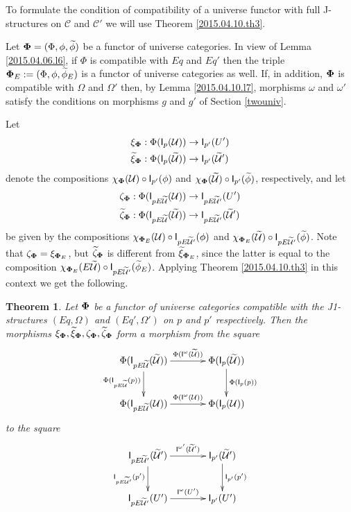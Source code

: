 \documentclass[12pt]{article}
\numberwithin{equation}{section}
\newtheorem{theorem}[proposition]{Theorem}
\newcommand{\sr}{\rightarrow}
\newcommand{\wt}{\widetilde}
\newcommand{\C}{{\mathcal C}}  %
\newcommand{\U}{\mathcal{U}}
\newcommand{\I}{\mathsf{I}}
\begin{document}
To formulate the condition of compatibility of a universe functor with full
J-structures on $\C$ and $\C'$ we will use Theorem
\ref{2015.04.10.th3}.

Let ${\bf\Phi}=(\Phi,\phi,\wt{\phi})$ be a functor of universe categories. In
view of Lemma \ref{2015.04.06.l6}, if $\Phi$ is compatible with $Eq$ and $Eq'$
then the triple ${\bf\Phi}_{E}:=(\Phi,\phi,\wt{\phi}_{E})$ is a functor of
universe categories as well. If, in addition, ${\bf\Phi}$ is compatible with
$\Omega$ and $\Omega'$ then, by Lemma \ref{2015.04.10.l7}, morphisms $\omega$
and $\omega'$ satisfy the conditions on morphisms $g$ and $g'$ of Section
\ref{twouniv}.

Let
%
\begin{align*}
  \xi_{\bf\Phi}&:\Phi(\I_p(\U))\sr \I_{p'}(U') \\
  \wt{\xi}_{\bf\Phi}&:\Phi(\I_p(\wt{\U}))\sr \I_{p'}(\wt{\U}')
\end{align*}
%
denote the compositions $\chi_{\bf\Phi}(\U)\circ \I_{p'}(\phi)$ and
$\chi_{\bf\Phi}(\wt{\U})\circ \I_{p'}(\wt{\phi})$, respectively, and let
%
\begin{align*}
  \zeta_{\bf\Phi}&:\Phi(\I_{pE\wt{\U}}(\U))\sr \I_{pE\wt{\U}'}(U') \\
  \wt{\zeta}_{\bf\Phi}&:\Phi(\I_{pE\wt{\U}}(\wt{\U}))\sr \I_{pE\wt{\U}'}(\wt{\U}')
\end{align*}
%
be given by the compositions $\chi_{{\bf\Phi}_{E}}(\U)\circ \I_{pE\wt{\U}'}(\phi)$
and $\chi_{{\bf\Phi}_{E}}(\wt{\U})\circ \I_{pE\wt{\U}'}(\wt{\phi})$. Note that
$\zeta_{\bf\Phi}=\xi_{{\bf\Phi}_{E}}$, but $\wt{\zeta}_{\bf\Phi}$ is different
from $\wt{\xi}_{{\bf\Phi}_{E}}$, since the latter is equal to the composition
$\chi_{{\bf\Phi}_{E}}(E\wt{\U})\circ \I_{pE\wt{\U}'}(\wt{\phi}_{E})$. Applying
Theorem \ref{2015.04.10.th3} in this context we get the following.
%
\begin{theorem}
\label{2015.04.10.th1} Let ${\bf\Phi}$ be a functor of universe categories
compatible with the J1-structures $(Eq,\Omega)$ and $(Eq',\Omega')$ on $p$ and
$p'$ respectively. Then the morphisms $\xi_{\bf\Phi}, \wt{\xi}_{\bf\Phi},
\zeta_{\bf\Phi}, \wt{\zeta}_{\bf\Phi}$ form a morphism from the square
%
$$
\begin{xy}
          \xymatrix@C=3pc{ \Phi(\I_{pE\wt{\U}}(\wt{\U}))
            \ar[r]^-{\Phi(\I^{\omega}(\wt{\U}))} \ar[d]_{\Phi(\I_{pE\wt{\U}}(p))} &
            \Phi(\I_p(\wt{\U}))\ar[d]^-{\Phi(\I_p(p))}\\ \Phi(\I_{pE\wt{\U}}(\U))
            \ar[r]^-{\Phi(\I^{\omega}(\U))} & \Phi(\I_p(\U)) }
\end{xy}
$$
%
to the square
%
$$
\begin{xy}
          \xymatrix@C=3pc{ \I_{pE\wt{\U}'}(\wt{\U}')
            \ar[r]^-{\I^{\omega'}(\wt{\U}')} \ar[d]_-{\I_{pE\wt{\U}'}(p')} &
            \I_{p'}(\wt{\U}')\ar[d]^-{\I_{p'}(p')}\\ \I_{pE\wt{\U}'}(U')
            \ar[r]^-{\I^{\omega}(U')} & \I_{p'}(U') }
\end{xy}
$$
%
\end{theorem}
\end{document}
